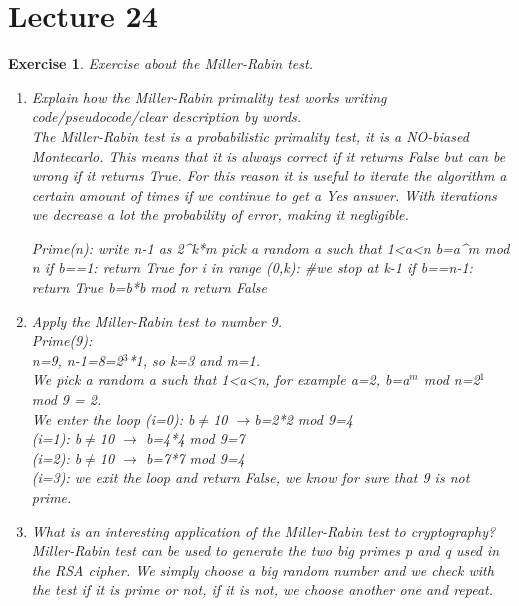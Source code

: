 \documentclass[a4paper, 12pt]{report}
\newtheorem{exercise}{\textbf{Exercise}}
\begin{document}
\chapter*{Lecture 24}
\begin{exercise}
	Exercise about the Miller-Rabin test.
	\begin{enumerate}
		\item Explain how the Miller-Rabin primality test works writing code/pseudocode/clear description by words.\\
		The Miller-Rabin test is a probabilistic primality test, it is a NO-biased Montecarlo. This means that it is always correct if it returns False but can be wrong if it returns True. For this reason it is useful to iterate the algorithm a certain amount of times if we continue to get a Yes answer. With iterations we decrease a lot the probability of error, making it negligible.
	
\begin{python}
Prime(n):
	write n-1 as 2^k*m
	pick a random a such that 1<a<n
	b=a^m mod n
	if b==1:
		return True
	for i in range (0,k): #we stop at k-1
		if b==n-1:
			return True
		b=b*b mod n
	return False
\end{python}
	
		\item Apply the Miller-Rabin test to number 9.\\
		Prime(9):\\
		n=9, n-1=8=2$^3$*1, so k=3 and m=1.\\
		We pick a random a such that 1<a<n, for example a=2, b=a$^m$ mod n=2$^1$ mod 9 = 2.\\
		We enter the loop (i=0): b$\ne$10 $\rightarrow$b=2*2 mod 9=4\\
		(i=1): b$\ne$10 $\rightarrow$ b=4*4 mod 9=7\\
		(i=2): b$\ne$10 $\rightarrow$ b=7*7 mod 9=4\\
		(i=3): we exit the loop and return False, we know for sure that 9 is not prime.
		
		\item What is an interesting application of the Miller-Rabin test to cryptography?\\
		Miller-Rabin test can be used to generate the two big primes \textit{p} and \textit{q} used in the RSA cipher. We simply choose a big random number and we check with the test if it is prime or not, if it is not, we choose another one and repeat.
	\end{enumerate}
\end{exercise}
\end{document}
